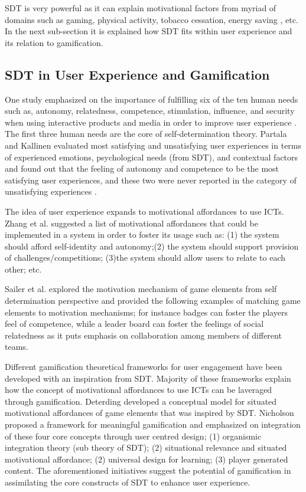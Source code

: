 \documentclass{sig-alternate}
\begin{document}
SDT is very powerful as it can explain motivational factors from myriad of domains such as gaming\cite{ryan2006:motivationalpull}, physical activity\cite{power2011:obesity}, tobacco cessation\cite{williams2006:testing}, energy saving \cite{webb2013:self}, etc. In the next sub-section it is explained how SDT fits within user experience and its relation to gamification.  
\subsection{SDT in User Experience and Gamification}
One study emphasized on the importance of fulfilling six of the ten human needs such as, autonomy, relatedness, competence, stimulation, influence, and security when using interactive products and media in order to improve user experience \cite{wiklund2009:needs}. The first three human needs are the core of self-determination theory. Partala and Kallinen \cite{partala2012:understanding} evaluated most satisfying and unsatisfying user experiences in terms of experienced emotions, psychological needs (from SDT), and contextual factors and found out that the feeling of autonomy and competence to be the most satisfying user experiences, and these two were never reported in the category of unsatisfying experiences \cite{partala2012:understanding}.

The idea of user experience expands to motivational affordances to use ICTs. Zhang et al.\cite{zhang2008:motivational} suggested a list of motivational affordances that could be implemented in a system in order to foster its usage such as: (1) the system should afford self-identity and autonomy;(2) the system should support provision of challenges/competitions; (3)the system should allow users to relate to each other; etc.

Sailer et al.\cite{sailer2013:psychological} explored the motivation mechanism of game elements from self determination perspective and provided the following examples of matching game elements to motivation mechanisms; for instance badges can foster the players feel of competence, while a leader board can foster the feelings of social relatedness as it puts emphasis on collaboration among members of different teams.

Different gamification theoretical frameworks for user engagement have been developed with an inspiration from SDT. Majority of these frameworks explain how the concept of motivational affordances to use ICTs can be laveraged through gamification. Deterding \cite{deterding2011:situated} developed  a conceptual model for situated motivational affordances of game elements that was inspired by SDT. Nicholson \cite{nicholson2012:user} proposed a framework for meaningful gamification and emphasized on integration of these four core concepts through user centred design; (1) organismic integration theory (sub theory of SDT); (2) situational relevance and situated motivational affordance; (2) universal design for learning; (3) player generated content. The aforementioned initiatives suggest the potential of gamification in assimilating the core constructs of SDT to enhance user experience.
\end{document}
